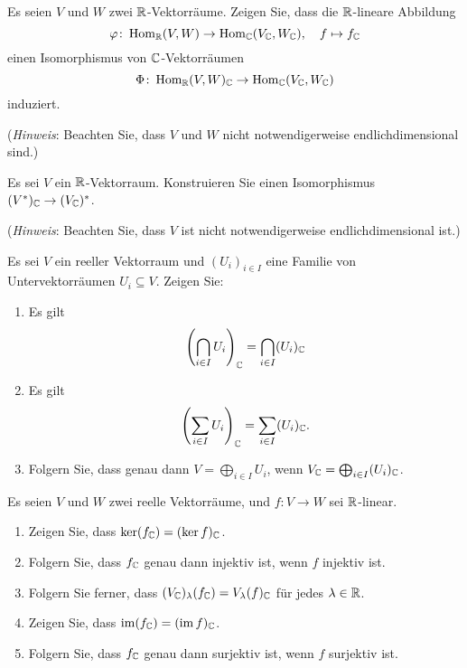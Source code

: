 \documentclass[a4paper,10pt]{scrartcl}
\begin{document}
\begin{question}
  Es seien $V$ und $W$ zwei $\mathbb{R}$-Vektorräume.
  Zeigen Sie, dass die $\mathbb{R}$-lineare Abbildung
  \[
    \varphi \colon \operatorname{Hom}_{\mathbb{R}}(V, W) \to \operatorname{Hom}_{\mathbb{C}}(V_{\mathbb{C}}, W_{\mathbb{C}}),
    \quad
    f \mapsto f_{\mathbb{C}}
  \]
  einen Isomorphismus von $\mathbb{C}$-Vektorräumen
  \[
    \Phi \colon \operatorname{Hom}_{\mathbb{R}}(V, W)_{\mathbb{C}} \to \operatorname{Hom}_{\mathbb{C}}(V_{\mathbb{C}}, W_{\mathbb{C}})
  \]
  induziert.
  
  (\emph{Hinweis}:
   Beachten Sie, dass $V$ und $W$ nicht notwendigerweise endlichdimensional sind.)
\end{question}


\begin{question}
  Es sei $V$ ein $\mathbb{R}$-Vektorraum.
  Konstruieren Sie einen Isomorphismus $(V^*)_{\mathbb{C}} \to (V_{\mathbb{C}})^*$.
  
  (\emph{Hinweis}:
   Beachten Sie, dass $V$ ist nicht notwendigerweise endlichdimensional ist.)
\end{question}


\begin{question}
  Es sei $V$ ein reeller Vektorraum und $(U_i)_{i \in I}$ eine Familie von Untervektorräumen $U_i \subseteq V$.
  Zeigen Sie:
  \begin{enumerate}[leftmargin=*]
    \item
      Es gilt
      \[
          \left( \bigcap_{i \in I} U_i \right)_{\mathbb{C}}
        = \bigcap_{i \in I} (U_i)_{\mathbb{C}}
      \]
    \item
      Es gilt
      \[
          \left( \sum_{i \in I} U_i \right)_{\mathbb{C}}
        = \sum_{i \in I} (U_i)_{\mathbb{C}}.
      \]
    \item
      Folgern Sie, dass genau dann $V = \bigoplus_{i \in I} U_i$, wenn $V_{\mathbb{C}} = \bigoplus_{i \in I} (U_i)_{\mathbb{C}}$.
  \end{enumerate}
\end{question}


\begin{question}
  Es seien $V$ und $W$ zwei reelle Vektorräume, und $f \colon V \to W$ sei $\mathbb{R}$-linear.
  \begin{enumerate}[leftmargin=*]
    \item
      Zeigen Sie, dass $\ker (f_{\mathbb{C}}) = (\ker f)_{\mathbb{C}}$.
    \item
      Folgern Sie, dass $f_{\mathbb{C}}$ genau dann injektiv ist, wenn $f$ injektiv ist.
    \item
      Folgern Sie ferner, dass $(V_{\mathbb{C}})_\lambda(f_{\mathbb{C}}) = V_\lambda(f)_{\mathbb{C}}$ für jedes $\lambda \in \mathbb{R}$.
    \item
      Zeigen Sie, dass $\operatorname{im} (f_{\mathbb{C}}) = (\operatorname{im} f)_{\mathbb{C}}$.
    \item
      Folgern Sie, dass $f_{\mathbb{C}}$ genau dann surjektiv ist, wenn $f$ surjektiv ist.
  \end{enumerate}
\end{question}
\end{document}
